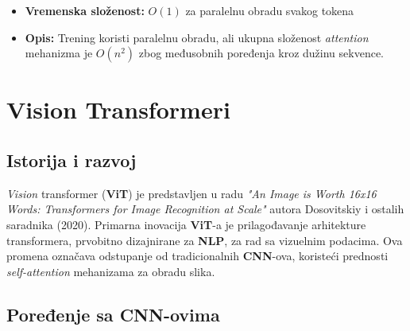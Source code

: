 \documentclass[12pt]{article}
\begin{document}
   \begin{itemize}
      \item \textbf{Vremenska složenost:} \(O(1)\) za paralelnu obradu svakog tokena
      \item \textbf{Opis:} Trening koristi paralelnu obradu, ali ukupna složenost \textit{attention} 
      mehanizma je \(O(n^2)\) zbog međusobnih poređenja kroz dužinu sekvence.
   \end{itemize}

   \section{Vision Transformeri}
   \subsection{Istorija i razvoj}
   \textit{Vision} transformer (\textbf{ViT}) je predstavljen u radu 
   \textit{"An Image is Worth 16x16 Words: Transformers for Image Recognition at Scale"} \cite{vit} 
   autora Dosovitskiy i ostalih saradnika (2020). Primarna inovacija \textbf{ViT}-a je 
   prilagođavanje arhitekture transformera, prvobitno dizajnirane za \textbf{NLP}, 
   za rad sa vizuelnim podacima. Ova promena označava odstupanje od 
   tradicionalnih \textbf{CNN}-ova, koristeći prednosti \textit{self-attention} mehanizama za obradu slika.

   \subsection{Poređenje sa CNN-ovima}
\end{document}
